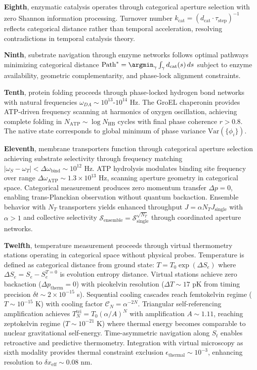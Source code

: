 \documentclass[12pt,a4paper]{article}
\theoremstyle{plain}
\theoremstyle{definition}
\theoremstyle{remark}
\newcommand{\St}{S_t}
\newcommand{\Se}{S_e}
\newcommand{\dcat}{d_{\mathrm{cat}}}
\begin{document}
\textbf{Eighth}, enzymatic catalysis operates through categorical aperture selection with zero Shannon information processing. Turnover number $k_{\text{cat}} = (\dcat \cdot \tau_{\text{step}})^{-1}$ reflects categorical distance rather than temporal acceleration, resolving contradictions in temporal catalysis theory.

\textbf{Ninth}, substrate navigation through enzyme networks follows optimal pathways minimizing categorical distance $\text{Path}^* = \argmin_\gamma \int_\gamma \dcat(s) \, ds$ subject to enzyme availability, geometric complementarity, and phase-lock alignment constraints.

\textbf{Tenth}, protein folding proceeds through phase-locked hydrogen bond networks with natural frequencies $\omega_{DA} \sim 10^{13}$-$10^{14}$ Hz. The GroEL chaperonin provides ATP-driven frequency scanning at harmonics of oxygen oscillation, achieving complete folding in $N_{\text{ATP}} \sim \log N_{\text{HB}}$ cycles with final phase coherence $r > 0.8$. The native state corresponds to global minimum of phase variance $\text{Var}(\{\phi_i\})$.

\textbf{Eleventh}, membrane transporters function through categorical aperture selection achieving substrate selectivity through frequency matching $|\omega_S - \omega_T| < \Delta \omega_{\text{bind}} \sim 10^{12}$ Hz. ATP hydrolysis modulates binding site frequency over range $\Delta \omega_{\text{ATP}} \sim 1.3 \times 10^{13}$ Hz, scanning aperture geometry in categorical space. Categorical measurement produces zero momentum transfer $\Delta p = 0$, enabling trans-Planckian observation without quantum backaction. Ensemble behavior with $N_T$ transporters yields enhanced throughput $J = \alpha N_T J_{\text{single}}$ with $\alpha > 1$ and collective selectivity $\mathcal{S}_{\text{ensemble}} = \mathcal{S}_{\text{single}}^{\sqrt{N_T}}$ through coordinated aperture networks.

\textbf{Twelfth}, temperature measurement proceeds through virtual thermometry stations operating in categorical space without physical probes. Temperature is defined as categorical distance from ground state: $T = T_0 \exp(\Delta \Se)$ where $\Delta \Se = \Se - \Se^{T=0}$ is evolution entropy distance. Virtual stations achieve zero backaction ($\Delta p_{\text{therm}} = 0$) with picokelvin resolution ($\Delta T \sim 17$ pK from timing precision $\delta t \sim 2 \times 10^{-15}$ s). Sequential cooling cascades reach femtokelvin regime ($T \sim 10^{-15}$ K) with cooling factor $\mathcal{C}_N = \alpha^{-2N}$. Triangular self-referencing amplification achieves $T_N^{\text{tri}} = T_0 (\alpha/A)^N$ with amplification $A \sim 1.11$, reaching zeptokelvin regime ($T \sim 10^{-21}$ K) where thermal energy becomes comparable to nuclear gravitational self-energy. Time-asymmetric navigation along $\St$ enables retroactive and predictive thermometry. Integration with virtual microscopy as sixth modality provides thermal constraint exclusion $\epsilon_{\text{thermal}} \sim 10^{-3}$, enhancing resolution to $\delta x_{\text{eff}} \sim 0.08$ nm.
\end{document}
